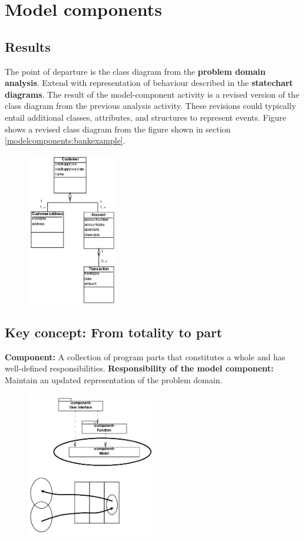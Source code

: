 \section{Model components}
\subsection{Results}
The point of departure is the class diagram from the \textbf{problem domain analysis}. Extend with representation of behaviour described in the \textbf{statechart diagrams}.
The result of the model-component activity is a revised version of the class diagram from the previous analysis activity. These revisions could typically entail additional classes, attributes, and structures to represent events. Figure shows a revised class diagram from the figure shown in section \ref{modelcomponents:bankexample}.

\begin{figure}[H]
    \centering
    \includegraphics[width=0.35\textwidth]{figures/modelcomponentresults.png}
\end{figure}

\subsection{Key concept: From totality to part}
\textbf{Component:} A collection of program parts that constitutes a whole and has well-defined responsibilities. \textbf{Responsibility of the model component:} Maintain an updated representation of the problem domain.

\begin{figure}[H]
    \centering
    \includegraphics[width=0.5\textwidth]{figures/modelcomponentfromtotalitytopart.png}
\end{figure}

